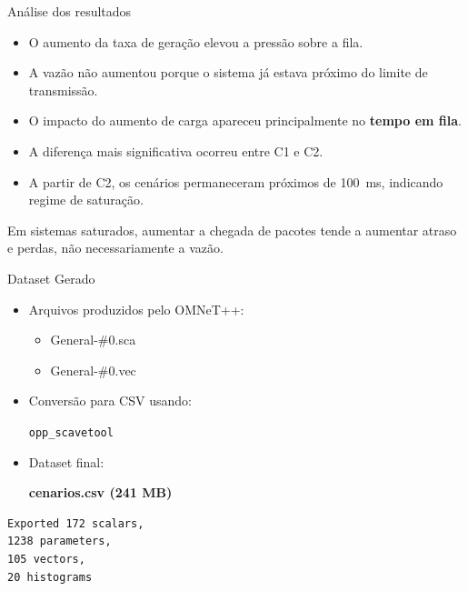 \documentclass[aspectratio=169]{beamer}
\begin{document}
\begin{frame}{Análise dos resultados}
\begin{itemize}
    \item O aumento da taxa de geração elevou a pressão sobre a fila.
    \item A vazão não aumentou porque o sistema já estava próximo do limite de transmissão.
    \item O impacto do aumento de carga apareceu principalmente no \textbf{tempo em fila}.
    \item A diferença mais significativa ocorreu entre C1 e C2.
    \item A partir de C2, os cenários permaneceram próximos de \SI{100}{ms}, indicando regime de saturação.
\end{itemize}

\begin{informacao}
Em sistemas saturados, aumentar a chegada de pacotes tende a aumentar atraso e perdas, não necessariamente a vazão.
\end{informacao}
\end{frame}
\begin{frame}[fragile]{Dataset Gerado}

\small

\begin{itemize}
\item Arquivos produzidos pelo OMNeT++:
\begin{itemize}
\item General-\#0.sca
\item General-\#0.vec
\end{itemize}

\item Conversão para CSV usando:

\texttt{opp\_scavetool}

\item Dataset final:

\textbf{cenarios.csv (241 MB)}
\end{itemize}

\vspace{0.3cm}

\begin{verbatim}
Exported 172 scalars,
1238 parameters,
105 vectors,
20 histograms
\end{verbatim}

\end{frame}
\end{document}

